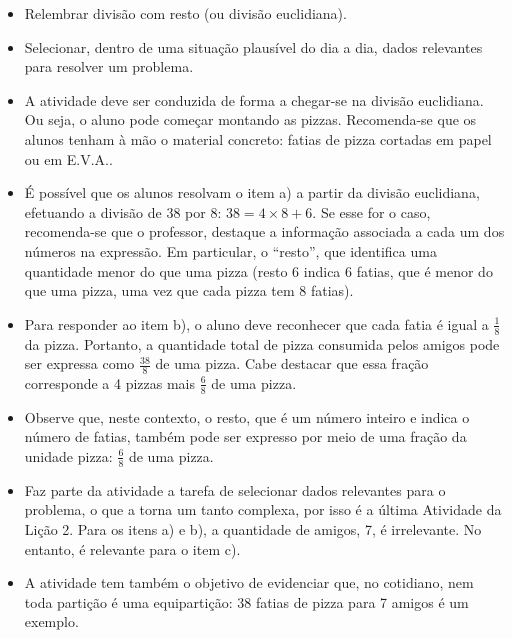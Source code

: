 \begin{multicols}{2}
\begin{objetivos}[label=chap2-ativ20]{}{}

\begin{itemize} %
    \item       Relembrar divisão com resto (ou divisão euclidiana).
    \item       Selecionar, dentro de uma situação plausível do dia a dia, dados relevantes para resolver um problema.
\end{itemize} %
\vspace{.1cm}
\end{objetivos}

\begin{orientacoes}

\begin{itemize} %
    \item       A atividade deve ser conduzida de forma a chegar-se na divisão euclidiana. Ou seja, o aluno pode começar montando as pizzas. Recomenda-se que os alunos tenham à mão o material concreto: fatias de pizza cortadas em papel ou em E.V.A..
    \item       É possível que os alunos resolvam o item a) a partir da divisão euclidiana, efetuando a divisão de 38 por 8: $38 = 4 \times 8 + 6$. Se esse for o caso, recomenda-se que o professor, destaque a informação associada a cada um dos números na expressão. Em particular, o       ``resto'', que identifica uma quantidade menor do que uma pizza (resto 6 indica 6 fatias, que é menor do que uma pizza, uma vez que cada pizza tem 8 fatias).
    \item       Para responder ao item b), o aluno deve reconhecer que cada fatia é igual a       $\frac{1}{8}$ da pizza. Portanto, a quantidade total de pizza consumida pelos amigos pode ser expressa como       $\frac{38}{8}$ de uma pizza. Cabe destacar que essa fração corresponde a 4 pizzas mais $\frac{6}{8}$ de uma pizza.
    \item        Observe que, neste contexto, o resto, que é um número inteiro e indica o número de fatias, também pode ser expresso por meio de uma fração da unidade pizza:       $\frac{6}{8}$ de uma pizza.
    \item       Faz parte da atividade a tarefa de selecionar dados relevantes para o problema, o que a torna um tanto complexa, por isso é a última Atividade da Lição 2. Para os itens a) e b), a quantidade de amigos, 7, é irrelevante. No entanto, é relevante para o item c).
    \item       A atividade tem também o objetivo de evidenciar que, no cotidiano, nem toda partição é uma equipartição: 38 fatias de pizza para 7 amigos é um exemplo.
\end{itemize} %
\end{orientacoes}


\end{multicols}
